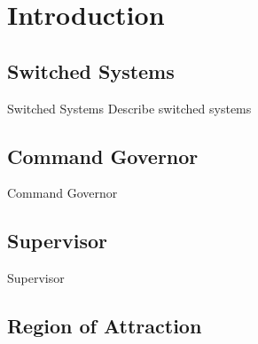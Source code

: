 
\section{Introduction}%
\label{sec:introduction}

\subsection{Switched Systems}%
\label{subsec:switched-systems}

\begin{slide}{Switched Systems}
  \vspace*{\fill}
  Describe switched systems
  \vspace*{\fill}
\end{slide}

\subsection{Command Governor}%
\label{subsec:cg}

\begin{slide}{Command Governor}
  \vspace*{\fill}
  
  \vspace*{\fill}
\end{slide}

\subsection{Supervisor}%
\label{subsec:supervisor}

\begin{slide}{Supervisor}
  \vspace*{\fill}
  
  \vspace*{\fill}
\end{slide}

\subsection{Region of Attraction}%
\label{subsec:roa}
